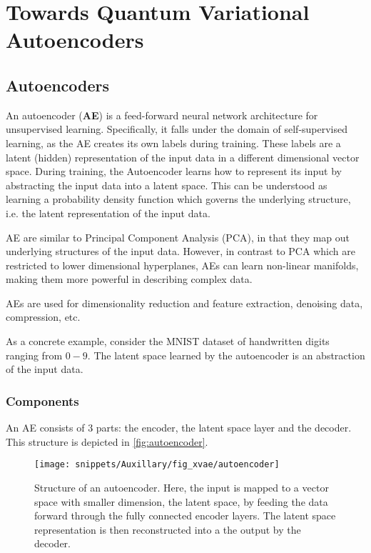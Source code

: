 
\chapter[]{Towards Quantum Variational Autoencoders}


\section{Autoencoders}
An autoencoder (\textbf{AE}) is a feed-forward neural network architecture for
unsupervised learning. Specifically, it falls under the domain of
self-supervised learning, as the AE creates its own labels during training.
These labels are a latent (hidden) representation of the input data in a
different dimensional vector space. During training, the Autoencoder learns how
to represent its input by abstracting the input data into a latent space. This
can be understood as learning a probability density function which governs the
underlying structure, i.e. the latent representation of the input data.

AE are similar to Principal Component Analysis (PCA), in that they map out
underlying structures of the input data. However, in contrast to PCA which are
restricted to lower dimensional hyperplanes, AEs can learn non-linear manifolds,
making them more powerful in describing complex data.

AEs are used for dimensionality reduction and feature extraction, denoising
data, compression, etc. 

As a concrete example, consider the MNIST dataset of handwritten digits ranging
from $0-9$. The latent space learned by the autoencoder is an abstraction of the
input data.

\subsection{Components}

An AE consists of 3 parts: the encoder, the latent space layer and the decoder.
This structure is depicted in \autoref{fig:autoencoder}.

\begin{figure}[ht!] \centering
  \texttt{[image: snippets/Auxillary/fig\_xvae/autoencoder]}
  \caption{Structure of an autoencoder. Here, the input is mapped to a vector
  space with smaller dimension, the latent space, by feeding the data forward
  through the fully connected encoder layers. The latent space representation is
  then reconstructed into a the output by the decoder.}
\label{fig:autoencoder} 
\end{figure}

